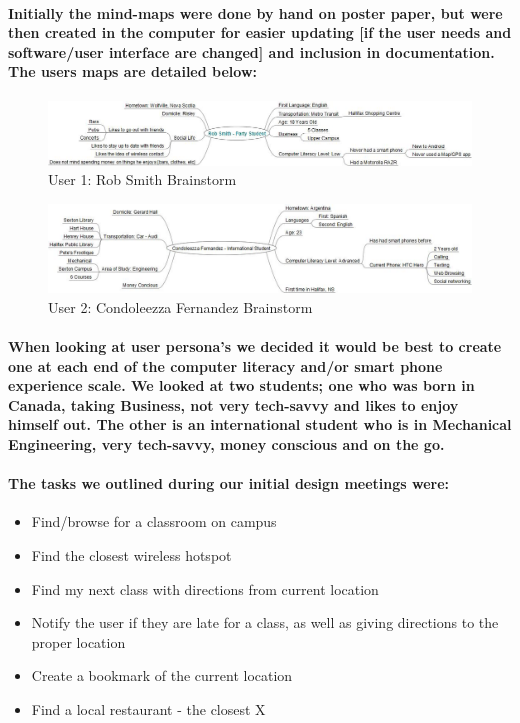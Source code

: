 \documentclass{report}
\begin{document}
    \paragraph{Initially the mind-maps were done by hand on poster paper, but were
    then created in the computer for easier updating [if the user needs and
    software/user interface are changed] and inclusion in documentation. The users
    maps are detailed below:}
    \begin{figure}
        \centering
            \includegraphics[width=\textwidth]{img/figure411.jpg}
        \caption{User 1: Rob Smith Brainstorm}
    \end{figure}
    \begin{figure}
        \centering
            \includegraphics[width=\textwidth]{img/figure412.jpg}
        \caption{User 2: Condoleezza Fernandez Brainstorm}
    \end{figure}
    \paragraph{When looking at user persona's we decided it would be best to
    create one at each end of the computer literacy and/or smart phone experience
    scale. We looked at two students; one who was born in Canada, taking Business,
    not very tech-savvy and likes to enjoy himself out. The other is an
    international student who is in Mechanical Engineering, very tech-savvy, money
    conscious and on the go.}
    \paragraph{The tasks we outlined during our initial design meetings were:}
    \begin{itemize}
    \item Find/browse for a classroom on campus
    \item Find the closest wireless hotspot
    \item Find my next class with directions from current location
    \item Notify the user if they are late for a class, as well as giving directions to
    the proper location
    \item Create a bookmark of the current location
    \item Find a local restaurant - the closest X
    \end{itemize}
\end{document}
